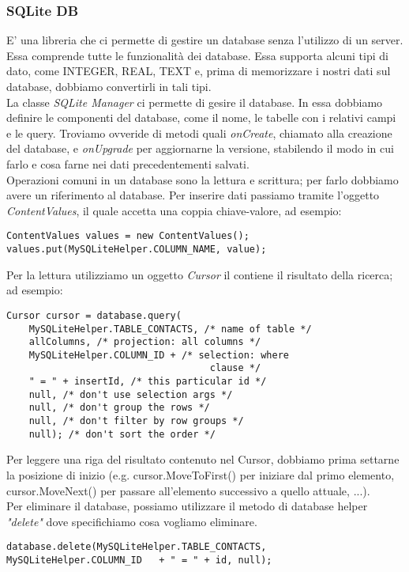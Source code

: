 \subsubsection{SQLite DB}
E' una libreria che ci permette di gestire un database senza l'utilizzo di un server. Essa comprende tutte le funzionalità dei database. Essa supporta alcuni tipi di dato, come INTEGER, REAL, TEXT e, prima di memorizzare i nostri dati sul database, dobbiamo convertirli in tali tipi.\\
La classe \textit{SQLite Manager} ci permette di gesire il database. In essa dobbiamo definire le componenti del database, come il nome, le tabelle con i relativi campi e le query. Troviamo ovveride di metodi quali \textit{onCreate}, chiamato alla creazione del database, e \textit{onUpgrade} per aggiornarne la versione, stabilendo il modo in cui farlo e cosa farne nei dati precedentementi salvati.\\
Operazioni comuni in un database sono la lettura e scrittura; per farlo dobbiamo avere un riferimento al database. Per inserire dati passiamo tramite l'oggetto \textit{ContentValues}, il quale accetta una coppia chiave-valore, ad esempio:
\begin{lstlisting}[frame=single]
ContentValues values = new ContentValues();
values.put(MySQLiteHelper.COLUMN_NAME, value);
\end{lstlisting}
Per la lettura utilizziamo un oggetto \textit{Cursor} il contiene il risultato della ricerca; ad esempio:
\begin{lstlisting}[frame=single]
Cursor cursor = database.query(
    MySQLiteHelper.TABLE_CONTACTS, /* name of table */
    allColumns, /* projection: all columns */
    MySQLiteHelper.COLUMN_ID + /* selection: where
                                    clause */
    " = " + insertId, /* this particular id */
    null, /* don't use selection args */
    null, /* don't group the rows */
    null, /* don't filter by row groups */
    null); /* don't sort the order */
\end{lstlisting}
Per leggere una riga del risultato contenuto nel Cursor, dobbiamo prima settarne la posizione di inizio (e.g. cursor.MoveToFirst() per iniziare dal primo elemento, cursor.MoveNext() per passare all'elemento successivo a quello attuale, ...).\\
Per eliminare il database, possiamo utilizzare il metodo di database helper \textit{"delete"} dove specifichiamo cosa vogliamo eliminare.
\begin{lstlisting}[frame=single]
database.delete(MySQLiteHelper.TABLE_CONTACTS,
MySQLiteHelper.COLUMN_ID   + " = " + id, null);
\end{lstlisting}
